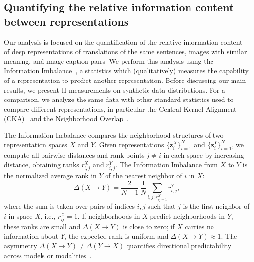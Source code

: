 \documentclass[10pt]{article} %
\begin{document}
\subsection{Quantifying the relative information content between representations}
Our analysis is focused on the quantification of the relative information content of deep representations of translations of the same sentences, images with similar meaning, and image-caption pairs. 
We perform this analysis using the Information Imbalance~\cite{II,Causality-II}, a statistics which (qualitatively) measures the capability of a representation to predict another representation. 
Before discussing our main results, we present II measurements on synthetic data distributions. 
For a comparison, we analyze the same data with other standard statistics used to compare different representations, in particular the Central Kernel Alignment (CKA)~\citep{CKA} and the Neighborhood Overlap~\citep{platonic_hypothesis}.

The Information Imbalance compares the neighborhood
structures of two representation spaces $X$ and $Y$. Given
representations $\{\mathbf{z}_i^X\}_{i=1}^N$ and $\{\mathbf{z}_i^Y\}_{i=1}^N$,
we compute all pairwise distances and rank points $j \neq i$ in each
space by increasing distance, obtaining ranks $r_{i,j}^X$ and
$r_{i,j}^Y$. The Information Imbalance from $X$ to $Y$ is the
normalized average rank in $Y$ of the nearest neighbor of $i$ in $X$:
\[
\Delta(X \rightarrow Y)
= \frac{2}{N-1}\,\frac{1}{N}\sum_{i,j: r^X_{ij=1} } r_{i,j}^{Y},
\]
where the sum is taken over pairs of indices $i,j$ such that $j$ is the first neighbor of $i$ in space $X$, i.e., $r^X_{ij}=1$. 
%
If neighborhoods in
$X$ predict neighborhoods in $Y$, these ranks are small and
$\Delta(X \rightarrow Y)$ is close to zero; if $X$ carries no
information about $Y$, the expected rank is uniform and
$\Delta(X \rightarrow Y) \approx 1$. The asymmetry
$\Delta(X \rightarrow Y) \neq \Delta(Y \rightarrow X)$ quantifies
directional predictability across models or modalities~\citep{II}.
\end{document}
